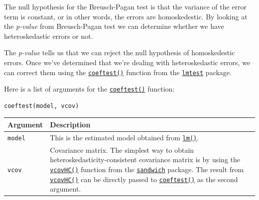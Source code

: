\documentclass[]{article}
\theoremstyle{definition}
\theoremstyle{definition}
\theoremstyle{definition}
\theoremstyle{remark}
\begin{document}
The null hypothesis for the Breusch-Pagan test is that the variance of
the error term is constant, or in other words, the errors are
homoskedestic. By looking at the \emph{p-value} from Breusch-Pagan test
we can determine whether we have heteroskedastic errors or not.

The \emph{p-value} tells us that we can reject the null hypothesis of
homoskedestic errors. Once we've determined that we're dealing with
heteroskedastic errors, we can correct them using the
\href{http://bit.ly/R_coeftest}{\texttt{coeftest()}} function from the
\href{http://bit.ly/R_lmtest}{\texttt{lmtest}} package.

Here is a list of arguments for the
\href{http://bit.ly/R_coeftest}{\texttt{coeftest()}} function:

\begin{verbatim}
coeftest(model, vcov)
\end{verbatim}

\begin{longtable}[]{@{}ll@{}}
\toprule
\begin{minipage}[b]{0.12\columnwidth}\raggedright\strut
Argument\strut
\end{minipage} & \begin{minipage}[b]{0.81\columnwidth}\raggedright\strut
Description\strut
\end{minipage}\tabularnewline
\midrule
\endhead
\begin{minipage}[t]{0.12\columnwidth}\raggedright\strut
\texttt{model}\strut
\end{minipage} & \begin{minipage}[t]{0.81\columnwidth}\raggedright\strut
This is the estimated model obtained from
\href{http://bit.ly/R_lm}{\texttt{lm()}}.\strut
\end{minipage}\tabularnewline
\begin{minipage}[t]{0.12\columnwidth}\raggedright\strut
\texttt{vcov}\strut
\end{minipage} & \begin{minipage}[t]{0.81\columnwidth}\raggedright\strut
Covariance matrix. The simplest way to obtain
heteroskedasticity-consistent covariance matrix is by using the
\href{http://bit.ly/R_vcovHC}{\texttt{vcovHC()}} function from the
\href{http://bit.ly/R_sandwich}{\texttt{sandwich}} package. The result
from \href{http://bit.ly/R_vcovHC}{\texttt{vcovHC()}} can be directly
passed to \href{http://bit.ly/R_coeftest}{\texttt{coeftest()}} as the
second argument.\strut
\end{minipage}\tabularnewline
\bottomrule
\end{longtable}
\end{document}
